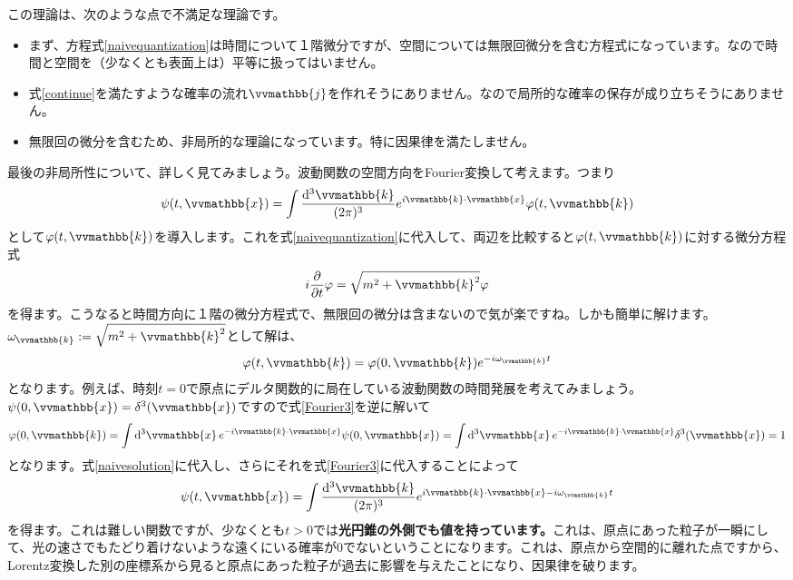 \documentclass[report,paper=a4, fontsize=12pt, line_length=16cm, number_of_lines=33,dvipdfmx]{jlreq}
\numberwithin{equation}{chapter}
\newcommand{\strong}[1]{{\sffamily \bfseries #1}}
\newcommand{\xb}{\vvmathbb{x}}
\newcommand{\kb}{\vvmathbb{k}}
\newcommand{\jb}{\vvmathbb{j}}
\begin{document}
この理論は、次のような点で不満足な理論です。
\begin{itemize}
  \item まず、方程式\eqref{naivequantization}は時間について１階微分ですが、空間については無限回微分を含む方程式になっています。なので時間と空間を（少なくとも表面上は）平等に扱ってはいません。
  \item 式\eqref{continue}を満たすような確率の流れ$\jb$を作れそうにありません。なので局所的な確率の保存が成り立ちそうにありません。
  \item 無限回の微分を含むため、非局所的な理論になっています。特に因果律を満たしません。
\end{itemize}

最後の非局所性について、詳しく見てみましょう。波動関数の空間方向をFourier変換して考えます。つまり
\begin{align}
  \psi(t,\xb)=\int\frac{\dd[3]{\kb}}{(2\pi)^3}e^{i\kb\cdot \xb}
  \varphi(t,\kb)\label{Fourier3}
\end{align}
として$\varphi(t,\kb)$を導入します。これを式\eqref{naivequantization}に代入して、両辺を比較すると$\varphi(t,\kb)$に対する微分方程式
\begin{align}
  i\pdv{t} \varphi = \sqrt{m^2+\kb^2} \varphi
\end{align}
を得ます。こうなると時間方向に１階の微分方程式で、無限回の微分は含まないので気が楽ですね。しかも簡単に解けます。$\omega_{\kb}:=\sqrt{m^2+\kb^2}$として解は、
\begin{align}
  \varphi(t,\kb)=\varphi(0,\kb)e^{-i\omega_{\kb}t}\label{naivesolution}
\end{align}
となります。例えば、時刻$t=0$で原点にデルタ関数的に局在している波動関数の時間発展を考えてみましょう。$\psi(0,\xb)=\delta^3(\xb)$ですので式\eqref{Fourier3}を逆に解いて
\begin{align}
  \varphi(0,\kb)
  =\int\dd[3]{\xb} e^{-i\kb\cdot \xb}\psi(0,\xb)
  =\int\dd[3]{\xb} e^{-i\kb\cdot \xb}\delta^3(\xb)
  =1
\end{align}
となります。式\eqref{naivesolution}に代入し、さらにそれを式\eqref{Fourier3}に代入することによって
\begin{align}
  \psi(t,\xb)=\int\frac{\dd[3]{\kb}}{(2\pi)^3}e^{i\kb\cdot \xb-i\omega_{\kb}t}
\end{align}
を得ます。これは難しい関数ですが、少なくとも$t>0$では\strong{光円錐の外側でも値を持っています。}これは、原点にあった粒子が一瞬にして、光の速さでもたどり着けないような遠くにいる確率が$0$でないということになります。これは、原点から空間的に離れた点ですから、Lorentz変換した別の座標系から見ると原点にあった粒子が過去に影響を与えたことになり、因果律を破ります。
\end{document}
